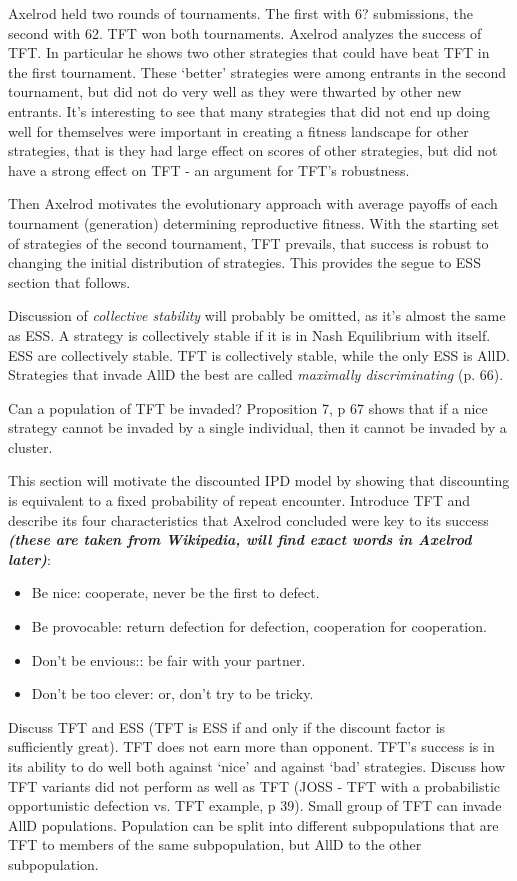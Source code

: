 Axelrod held two rounds of tournaments. The first with 6? submissions, the second with 62. TFT won both tournaments. Axelrod analyzes the success of TFT. In particular he shows two other strategies that could have beat TFT in the first tournament. These `better' strategies were among entrants in the second tournament, but did not do very well as they were thwarted by other new entrants. It's interesting to see that many strategies that did not end up doing well for themselves were important in creating a fitness landscape for other strategies, that is they had large effect on scores of other strategies, but did not have a strong effect on TFT - an argument for TFT's robustness.

Then Axelrod motivates the evolutionary approach with average payoffs of each tournament (generation) determining reproductive fitness. With the starting set of strategies of the second tournament, TFT prevails, that success is robust to changing the initial distribution of strategies. This provides the segue to ESS section that follows.

Discussion of \textit{collective stability} will probably be omitted, as it's almost the same as ESS. A strategy is collectively stable if it is in Nash Equilibrium with itself. ESS are collectively stable. TFT is collectively stable, while the only ESS is AllD. Strategies that invade AllD the best are called \textit{maximally discriminating} (p. 66).

Can a population of TFT be invaded? Proposition 7, p 67 shows that if a nice strategy cannot be invaded by a single individual, then it cannot be invaded by a cluster. 

This section will motivate the discounted IPD model by showing that discounting is equivalent to a fixed probability of repeat encounter. Introduce TFT and describe its four characteristics that Axelrod concluded were key to its success \textit{\textbf{(these are taken from Wikipedia, will find exact words in Axelrod later)}}:
\begin{itemize}
\item Be nice: cooperate, never be the first to defect.
\item Be provocable: return defection for defection, cooperation for cooperation.
\item Don't be envious:: be fair with your partner.
\item Don't be too clever: or, don't try to be tricky.
\end{itemize}
Discuss TFT and ESS (TFT is ESS if and only if the discount factor is sufficiently great). TFT does not earn more than opponent. TFT's success is in its ability to do well both against `nice' and against `bad' strategies. Discuss how TFT variants did not perform as well as TFT (JOSS - TFT with a probabilistic opportunistic defection vs. TFT example, p 39). Small group of TFT can invade AllD populations. Population can be split into different subpopulations that are TFT to members of the same subpopulation, but AllD to the other subpopulation.

